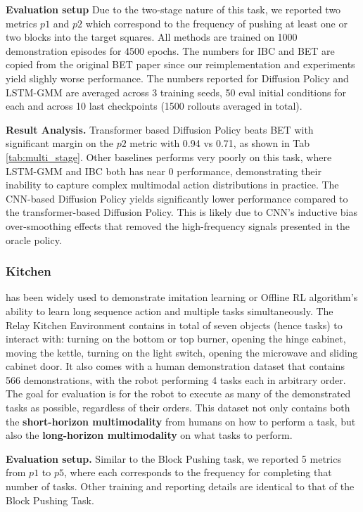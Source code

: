 \textbf{Evaluation setup} Due to the two-stage nature of this task, we reported two metrics $p1$ and $p2$ which correspond to the frequency of pushing at least one or two blocks into the target squares. All methods are trained on 1000 demonstration episodes for 4500 epochs. The numbers for IBC and BET are copied from the original BET paper \cite{bet} since our reimplementation and experiments yield slighly worse performance. The numbers reported for Diffusion Policy and LSTM-GMM are averaged across 3 training seeds, 50 eval initial conditions for each and across 10 last checkpoints (1500 rollouts averaged in total).

\textbf{Result Analysis.} Transformer based Diffusion Policy beats BET \cite{bet} with significant margin on the $p2$ metric with 0.94 vs 0.71, as shown in Tab \ref{tab:multi_stage}. Other baselines performs very poorly on this task, where LSTM-GMM and IBC both has near 0 performance, demonstrating their inability to capture complex multimodal action distributions in practice. The CNN-based Diffusion Policy yields significantly lower performance compared to the transformer-based Diffusion Policy. This is likely due to CNN's inductive bias over-smoothing effects that removed the high-frequency signals presented in the oracle policy.

\subsubsection{\textbf{Kitchen}} has been widely used to demonstrate imitation learning or Offline RL algorithm's ability to learn long sequence action and multiple tasks simultaneously. The Relay Kitchen Environment \cite{gupta2019relay} contains in total of seven objects (hence tasks) to interact with: turning on the bottom or top burner, opening the hinge cabinet, moving the kettle, turning on the light switch, opening the microwave and sliding cabinet door. It also comes with a human demonstration dataset that contains 566 demonstrations, with the robot performing 4 tasks each in arbitrary order. The goal for evaluation is for the robot to execute as many of the demonstrated tasks as possible, regardless of their orders. This dataset not only contains both the \textbf{short-horizon multimodality} from humans on how to perform a task, but also the \textbf{long-horizon multimodality} on what tasks to perform. 

\textbf{Evaluation setup.} Similar to the Block Pushing task, we reported 5 metrics from $p1$ to $p5$, where each corresponds to the frequency for completing that number of tasks. Other training and reporting details are identical to that of the Block Pushing Task.

